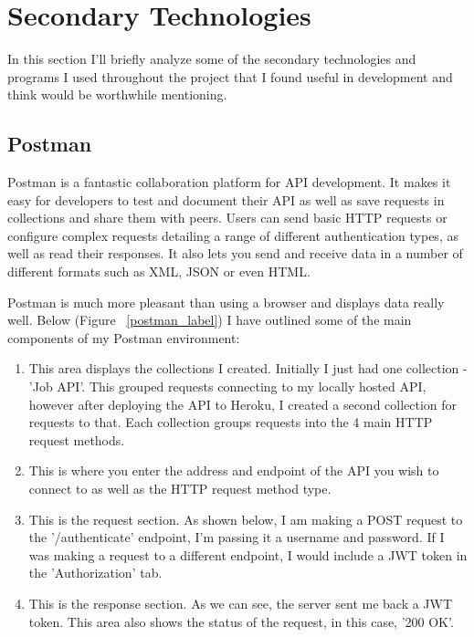 \section{Secondary Technologies}
In this section I'll briefly analyze some of the secondary technologies and programs I used throughout the project that I found useful in development and think would be worthwhile mentioning.

\subsection{Postman}
Postman is a fantastic collaboration platform for API development. It makes it easy for developers to test and document their API as well as save requests in collections and share them with peers. Users can send basic HTTP requests or configure complex requests detailing a range of different authentication types, as well as read their responses. It also lets you send and receive data in a number of different formats such as XML, JSON or even HTML.

Postman is much more pleasant than using a browser and displays data really well. Below (Figure ~\ref{postman_label}) I have outlined some of the main components of my Postman environment:
\begin{enumerate}
    \item This area displays  the collections I created. Initially I just had one collection - 'Job API'. This grouped requests connecting to my locally hosted API, however after deploying the API to Heroku, I created a second collection for requests to that. Each collection groups requests into the 4 main HTTP request methods.
    \item This is where you enter the address and endpoint of the API you wish to connect to as well as the HTTP request method type.
    \item This is the request section. As shown below, I am making a POST request to the '/authenticate' endpoint, I'm passing it a username and password. If I was making a request to a different endpoint, I would include a JWT token in the 'Authorization' tab.
    \item This is the response section. As we can see, the server sent me back a JWT token. This area also shows the status of the request, in this case, '200 OK'. 
\end{enumerate}

